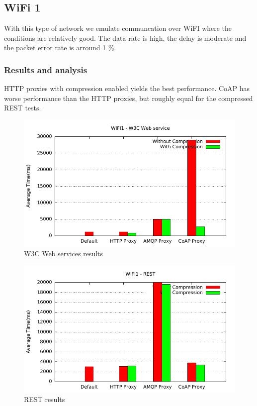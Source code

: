 \subsection{WiFi 1}

With this type of network we emulate communcation over WiFI where the
conditions are relatively good. The data rate is high, the delay is moderate
and the packet error rate is arround 1 \%.

\subsubsection{Results and analysis}

HTTP proxies with compression enabled yields the best performance. CoAP has
worse performance than the HTTP proxies, but roughly equal for the compressed
REST tests.


\begin{figure}[H]
\center
\includegraphics[scale=0.75]{../results/wifi1/nffi/out.pdf}
\caption{W3C Web services results}
\end{figure}

\begin{figure}[H]
\center
\includegraphics[scale=0.75]{../results/wifi1/rest/out.pdf}
\caption{REST results}
\end{figure}


